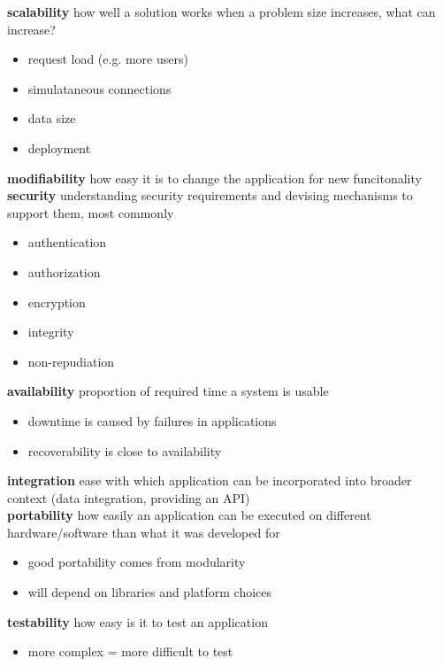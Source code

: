 \documentclass[]{article}
\theoremstyle{definition}
\begin{document}
	\textbf{scalability} how well a solution works when a problem size increases, what can increase?
	\begin{itemize}
		\item request load (e.g. more users)
		\item simulataneous connections
		\item data size
		\item deployment
	\end{itemize}

	\textbf{modifiability} how easy it is to change the application for new funcitonality \\

	\textbf{security} understanding security requirements and devising mechanisms to support them, most commonly
	\begin{itemize}
		\item authentication
		\item authorization
		\item encryption
		\item integrity
		\item non-repudiation
	\end{itemize}

	\textbf{availability} proportion of required time a system is usable
	\begin{itemize}
		\item downtime is caused by failures in applications
		\item recoverability is close to availability
	\end{itemize}

	\textbf{integration} ease with which application can be incorporated into broader context (data integration, providing an API) \\

	\textbf{portability} how easily an application can be executed on different hardware/software than what it was developed for
	\begin{itemize}
		\item good portability comes from modularity
		\item will depend on libraries and platform choices
	\end{itemize}

	\textbf{testability} how easy is it to test an application
	\begin{itemize}
		\item more complex = more difficult to test
	\end{itemize}
\end{document}
